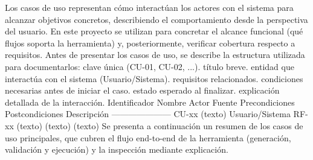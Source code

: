 {}\markdownRendererInterblockSeparator
{}Los casos de uso representan cómo interactúan los actores con el sistema para alcanzar objetivos concretos, describiendo el comportamiento desde la perspectiva del usuario. En este proyecto se utilizan para concretar el alcance funcional (qué flujos soporta la herramienta) y, posteriormente, verificar cobertura respecto a requisitos.\markdownRendererInterblockSeparator
{}Antes de presentar los casos de uso, se describe la estructura utilizada para documentarlos:\markdownRendererInterblockSeparator
{}\markdownRendererUlBeginTight
\markdownRendererUlItem {} clave única (CU-01, CU-02, ...).\markdownRendererUlItemEnd 
\markdownRendererUlItem {} título breve.\markdownRendererUlItemEnd 
\markdownRendererUlItem {} entidad que interactúa con el sistema (Usuario/Sistema).\markdownRendererUlItemEnd 
\markdownRendererUlItem {} requisitos relacionados.\markdownRendererUlItemEnd 
\markdownRendererUlItem {} condiciones necesarias antes de iniciar el caso.\markdownRendererUlItemEnd 
\markdownRendererUlItem {} estado esperado al finalizar.\markdownRendererUlItemEnd 
\markdownRendererUlItem {} explicación detallada de la interacción.\markdownRendererUlItemEnd 
\markdownRendererUlEndTight \markdownRendererInterblockSeparator
{}\markdownRendererInterblockSeparator
{}\markdownRendererPipe{} Identificador \markdownRendererPipe{} Nombre \markdownRendererPipe{} Actor \markdownRendererPipe{} Fuente \markdownRendererPipe{} Precondiciones \markdownRendererPipe{} Postcondiciones \markdownRendererPipe{} Descripción \markdownRendererPipe{} \markdownRendererPipe{}---\markdownRendererPipe{}---\markdownRendererPipe{}---\markdownRendererPipe{}---\markdownRendererPipe{}---\markdownRendererPipe{}---\markdownRendererPipe{}---\markdownRendererPipe{} \markdownRendererPipe{} CU-xx \markdownRendererPipe{} (texto) \markdownRendererPipe{} Usuario/Sistema \markdownRendererPipe{} RF-xx \markdownRendererPipe{} (texto) \markdownRendererPipe{} (texto) \markdownRendererPipe{} (texto) \markdownRendererPipe{}\markdownRendererInterblockSeparator
{}\markdownRendererInterblockSeparator
{}Se presenta a continuación un resumen de los casos de uso principales, que cubren el flujo end-to-end de la herramienta (generación, validación y ejecución) y la inspección mediante explicación.\markdownRendererInterblockSeparator
